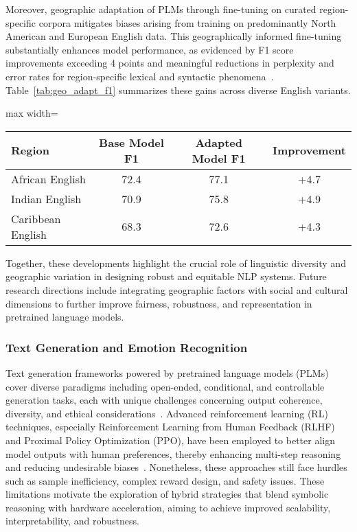 \documentclass[sigconf]{acmart}
\begin{document}
Moreover, geographic adaptation of PLMs through fine-tuning on curated region-specific corpora mitigates biases arising from training on predominantly North American and European English data. This geographically informed fine-tuning substantially enhances model performance, as evidenced by F1 score improvements exceeding 4 points and meaningful reductions in perplexity and error rates for region-specific lexical and syntactic phenomena~\cite{ref30}. Table~\ref{tab:geo_adapt_f1} summarizes these gains across diverse English variants.

\begin{table*}[htbp]
\centering
\caption{Improvements in F1 scores from Geographic Adaptation of PLMs on Regional English Variants~\cite{ref30}}
\label{tab:geo_adapt_f1}
\begin{adjustbox}{max width=\textwidth}
\begin{tabular}{@{}lccc@{}}
\toprule
Region & Base Model F1 & Adapted Model F1 & Improvement \\ \midrule
African English & 72.4 & 77.1 & +4.7 \\
Indian English & 70.9 & 75.8 & +4.9 \\
Caribbean English & 68.3 & 72.6 & +4.3 \\ \bottomrule
\end{tabular}
\end{adjustbox}
\end{table*}

Together, these developments highlight the crucial role of linguistic diversity and geographic variation in designing robust and equitable NLP systems. Future research directions include integrating geographic factors with social and cultural dimensions to further improve fairness, robustness, and representation in pretrained language models.

\subsubsection{Text Generation and Emotion Recognition}

Text generation frameworks powered by pretrained language models (PLMs) cover diverse paradigms including open-ended, conditional, and controllable generation tasks, each with unique challenges concerning output coherence, diversity, and ethical considerations~\cite{ref39}. Advanced reinforcement learning (RL) techniques, especially Reinforcement Learning from Human Feedback (RLHF) and Proximal Policy Optimization (PPO), have been employed to better align model outputs with human preferences, thereby enhancing multi-step reasoning and reducing undesirable biases~\cite{ref9}. Nonetheless, these approaches still face hurdles such as sample inefficiency, complex reward design, and safety issues. These limitations motivate the exploration of hybrid strategies that blend symbolic reasoning with hardware acceleration, aiming to achieve improved scalability, interpretability, and robustness.
\end{document}
